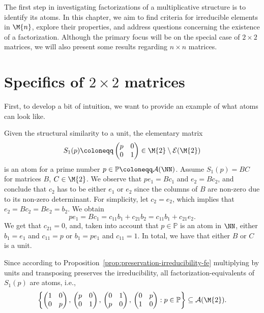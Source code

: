 The first step in investigating factorizations of a multiplicative structure is to identify its atoms. In this chapter, we aim to find criteria for irreducible elements in $\M{n}$, explore their properties, and address questions concerning the existence of a factorization. Although the primary focus will be on the special case of $2 \times 2$ matrices, we will also present some results regarding $n \times n$ matrices.

\section{Specifics of $2\times 2$ matrices}
First, to develop a bit of intuition, we want to provide an example of what atoms can look like.

\begin{example}\label{ex:2x2-atoms}
Given the structural similarity to a unit, the elementary matrix 
\[S_1(p) \coloneqq \begin{pmatrix} p & 0 \\ 0 & 1 \end{pmatrix} \in \M{2}\setminus\mathcal{E}(\M{2})\]
is an atom for a prime number $p \in \mathbb{P} \coloneqq \mathcal{A}(\NN)$. Assume $S_1(p)  = BC$ for matrices $B$, $C \in \M{2}$. We observe that $pe_1 = Bc_1$ and $e_2 = Bc_2$, and conclude that $c_2$ has to be either $e_1$ or $e_2$ since the columns of $B$ are non-zero due to its non-zero determinant. For simplicity, let $c_2 = e_2$, which implies that $e_2 = Bc_2=Be_2=b_2$. We obtain
\[ pe_1 = Bc_1 = c_{11}b_1 + c_{21}b_2 = c_{11}b_1 +c_{21}e_2. \]
We get that $c_{21} = 0$, and, taken into account that $p \in \mathbb{P}$ is an atom in $\NN$, either $b_1 = e_1$ and $c_{11} = p$ or $b_1 = pe_1$ and $c_{11} = 1$. In total, we have that either $B$ or $C$ is a unit.
\end{example}

\begin{remark*}
Since according to Proposition~\ref{prop:preservation-irreducibility-fe} multiplying by units and transposing preserves the irreducibility, all factorization-equivalents of $S_1(p)$ are atoms, i.e.,
\[ \left\{ \begin{pmatrix} 1 & 0 \\ 0 & p \end{pmatrix},\, \begin{pmatrix} p & 0 \\ 0 & 1 \end{pmatrix}, \, \begin{pmatrix} 0 & 1 \\ p & 0 \end{pmatrix}, \, \begin{pmatrix} 0 & p \\ 1 & 0 \end{pmatrix} : p \in \mathbb{P} \right\} \subseteq \mathcal{A}(\M{2}). \]
\end{remark*}

